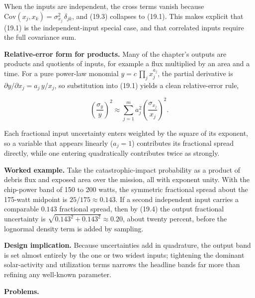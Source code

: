 \documentclass[
  11pt,
  openany,
  oneside]{book}
\begin{document}
When the inputs are independent, the cross terms vanish because
\(\mathrm{Cov}(x_j,x_k)=\sigma_{x_j}^2\,\delta_{jk}\), and (19.3)
collapses to (19.1). This makes explicit that (19.1) is the
independent-input special case, and that correlated inputs require the
full covariance sum.

\textbf{Relative-error form for products.} Many of the chapter's outputs
are products and quotients of inputs, for example a flux multiplied by
an area and a time. For a pure power-law monomial
\(y = c\,\prod_j x_j^{a_j}\), the partial derivative is
\(\partial y/\partial x_j = a_j\,y/x_j\), so substitution into (19.1)
yields a clean relative-error rule,

\begin{equation}
\left(\frac{\sigma_y}{y}\right)^2 \approx \sum_{j=1}^{m} a_j^2\left(\frac{\sigma_{x_j}}{x_j}\right)^2. \tag{19.4}
\end{equation}

Each fractional input uncertainty enters weighted by the square of its
exponent, so a variable that appears linearly (\(a_j=1\)) contributes
its fractional spread directly, while one entering quadratically
contributes twice as strongly.

\textbf{Worked example.} Take the catastrophic-impact probability as a
product of debris flux and exposed area over the mission, all with
exponent unity. With the chip-power band of 150 to 200 watts, the
symmetric fractional spread about the 175-watt midpoint is
\(25/175 \approx 0.143\). If a second independent input carries a
comparable \(0.143\) fractional spread, then by (19.4) the output
fractional uncertainty is \(\sqrt{0.143^2 + 0.143^2} \approx 0.20\),
about twenty percent, before the lognormal density term is added by
sampling.

\textbf{Design implication.} Because uncertainties add in quadrature,
the output band is set almost entirely by the one or two widest inputs;
tightening the dominant solar-activity and utilization terms narrows the
headline bands far more than refining any well-known parameter.

\textbf{Problems.}
\end{document}
